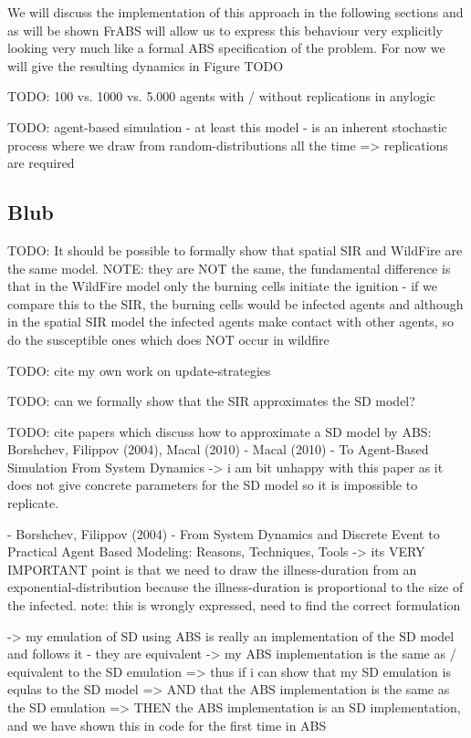 We will discuss the implementation of this approach in the following sections and as will be shown FrABS will allow us to express this behaviour very explicitly looking very much like a formal ABS specification of the problem. For now we will give the resulting dynamics in Figure TODO

TODO: 100 vs. 1000 vs. 5.000 agents with / without replications in anylogic

TODO: agent-based simulation - at least this model - is an inherent stochastic process where we draw from random-distributions all the time => replications are required

\subsection{Blub}
TODO: It should be possible to formally show that spatial SIR and WildFire are the same model. NOTE: they are NOT the same, the fundamental difference is that in the WildFire model only the burning cells initiate the ignition - if we compare this to the SIR, the burning cells would be infected agents and although in the spatial SIR model the infected agents make contact with other agents, so do the susceptible ones which does NOT occur in wildfire

TODO: cite my own work on update-strategies

TODO: can we formally show that the SIR approximates the SD model?

TODO: cite papers which discuss how to approximate a SD model by ABS: Borshchev, Filippov (2004), Macal (2010)
- Macal (2010) - To Agent-Based Simulation From System Dynamics 
	-> i am bit unhappy with this paper as it does not give concrete parameters for the SD model so it is impossible to replicate. 

- Borshchev, Filippov (2004) - From System Dynamics and Discrete Event to Practical Agent Based Modeling: Reasons, Techniques, Tools
	-> its VERY IMPORTANT point is that we need to draw the illness-duration from an exponential-distribution because the illness-duration is proportional to the size of the infected. note: this is wrongly expressed, need to find the correct formulation

		-> my emulation of SD using ABS is really an implementation of the SD model and follows it - they are equivalent
		-> my ABS implementation is the same as / equivalent to the SD emulation
			=> thus if i can show that my SD emulation is equlas to the SD model
			=> AND that the ABS implementation is the same as the SD emulation
			=> THEN the ABS implementation is an SD implementation, and we have shown this in code for the first time in ABS
			
